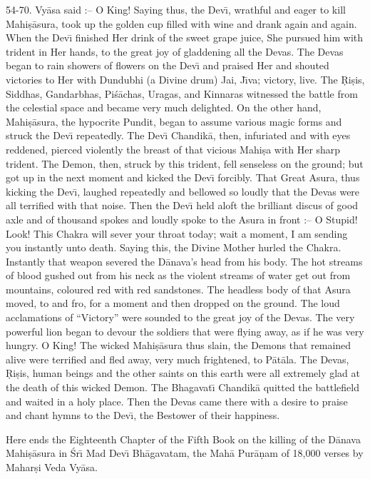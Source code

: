 54-70. Vy\=asa said :-- O King! Saying thus, the Dev\={\i}, wrathful and eager to kill Mahi\d{s}\=asura, took up the golden cup filled with wine and drank again and again. When the Dev\={\i} finished Her drink of the sweet grape juice, She pursued him with trident in Her hands, to the great joy of gladdening all the Devas. The Devas began to rain showers of flowers on the Dev\={\i} and praised Her and shouted victories to Her with Dundubhi (a Divine drum) Jai, J\={\i}va; victory, live. The \d{R}i\d{s}is, Siddhas, Gandarbhas, Pi\'s\=achas, Uragas, and Kinnaras witnessed the battle from the celestial space and became very much delighted. On the other hand, Mahi\d{s}\=asura, the hypocrite Pundit, began to assume various magic forms and struck the Dev\={\i} repeatedly. The Dev\={\i} Chandik\=a, then, infuriated and with eyes reddened, pierced violently the breast of that vicious Mahi\d{s}a with Her sharp trident. The Demon, then, struck by this trident, fell senseless on the ground; but got up in the next moment and kicked the Dev\={\i} forcibly. That Great Asura, thus kicking the Dev\={\i}, laughed repeatedly and bellowed so loudly that the Devas were all terrified with that noise. Then the Dev\={\i} held aloft the brilliant discus of good axle and of thousand spokes and loudly spoke to the Asura in front :-- O Stupid! Look! This Chakra will sever your throat today; wait a moment, I am sending you instantly unto death. Saying this, the Divine Mother hurled the Chakra. Instantly that weapon severed the D\=anava's head from his body. The hot streams of blood gushed out from his neck as the violent streams of water get out from mountains, coloured red with red sandstones. The headless body of that Asura moved, to and fro, for a moment and then dropped on the ground. The loud acclamations of ``Victory'' were sounded to the great joy of the Devas. The very powerful lion began to devour the soldiers that were flying away, as if he was very hungry. O King! The wicked Mahi\d{s}\=asura thus slain, the Demons that remained alive were terrified and fled away, very much frightened, to P\=at\=ala. The Devas, \d{R}i\d{s}is, human beings and the other saints on this earth were all extremely glad at the death of this wicked Demon. The Bhagavat\={\i} Chandik\=a quitted the battlefield and waited in a holy place. Then the Devas came there with a desire to praise and chant hymns to the Dev\={\i}, the Bestower of their happiness.

Here ends the Eighteenth Chapter of the Fifth Book on the killing of the D\=anava Mahi\d{s}\=asura in \'Sr\={\i} Mad Dev\={\i} Bh\=agavatam, the Mah\=a Pur\=a\d{n}am of 18,000 verses by Mahar\d{s}i Veda Vy\=asa.



